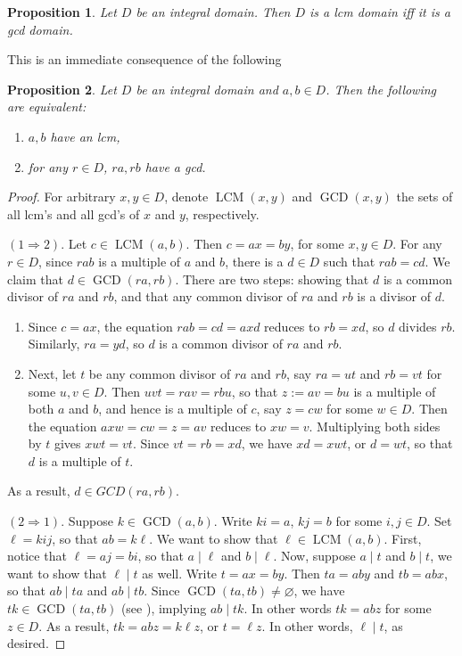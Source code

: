 \documentclass[12pt]{article}
\newtheorem{prop}{Proposition}
\newcommand{\GCD}{\operatorname{GCD}}
\newcommand{\LCM}{\operatorname{LCM}}
\begin{document}
\begin{prop} Let $D$ be an integral domain.  Then $D$ is a lcm domain iff it is a gcd domain. \end{prop}

This is an immediate consequence of the following

\begin{prop} Let $D$ be an integral domain and $a,b\in D$.  Then the following are equivalent:
\begin{enumerate}
\item $a,b$ have an lcm,
\item for any $r\in D$, $ra,rb$ have a gcd. 
\end{enumerate}
\end{prop}

\begin{proof}  For arbitrary $x,y \in D$, denote $\LCM(x,y)$ and $\GCD(x,y)$ the sets of all lcm's and all gcd's of $x$ and $y$, respectively.

$(1\Rightarrow 2)$.  Let $c\in \LCM(a,b)$.  Then $c=ax=by$, for some $x,y\in D$.  For any $r\in D$, since $rab$ is a multiple of $a$ and $b$, there is a $d\in D$ such that $rab=cd$.  We claim that $d\in \GCD(ra,rb)$.  There are two steps: showing that $d$ is a common divisor of $ra$ and $rb$, and that any common divisor of $ra$ and $rb$ is a divisor of $d$.
\begin{enumerate}
\item 
Since $c=ax$, the equation $rab=cd=axd$ reduces to $rb=xd$, so $d$ divides $rb$.  Similarly, $ra=yd$, so $d$ is a common divisor of $ra$ and $rb$.  
\item
Next, let $t$ be any common divisor of $ra$ and $rb$, say $ra=ut$ and $rb=vt$ for some $u,v\in D$.  Then $uvt=rav=rbu$, so that $z:=av=bu$ is a multiple of both $a$ and $b$, and hence is a multiple of $c$, say $z=cw$ for some $w\in D$.  Then the equation $axw=cw=z=av$ reduces to $xw=v$.  Multiplying both sides by $t$ gives $xwt=vt$.  Since $vt=rb=xd$, we have $xd=xwt$, or $d=wt$, so that $d$ is a multiple of $t$.
\end{enumerate}
As a result, $d\in GCD(ra,rb)$.

$(2\Rightarrow 1)$.  Suppose $k\in \GCD(a,b)$.  Write $ki=a$, $kj=b$ for some $i,j\in D$.  Set $\ell = kij$, so that $ab=k\ell$.  We want to show that $\ell \in \LCM(a,b)$.  First, notice that $\ell = aj=bi$, so that $a\mid \ell$ and $b\mid \ell$.  Now, suppose $a\mid t$ and $b\mid t$, we want to show that $\ell \mid t$ as well.  Write $t=ax=by$.  Then $ta=aby$ and $tb=abx$, so that $ab\mid ta$ and $ab\mid tb$.  Since $\GCD(ta,tb)\ne \varnothing$, we have $tk\in \GCD(ta,tb)$ (see ), implying $ab\mid tk$.  In other words $tk=abz$ for some $z\in D$.  As a result, $tk=abz=k\ell z$, or $t=\ell z$.  In other words, $\ell \mid t$, as desired.
\end{proof}
\end{document}
